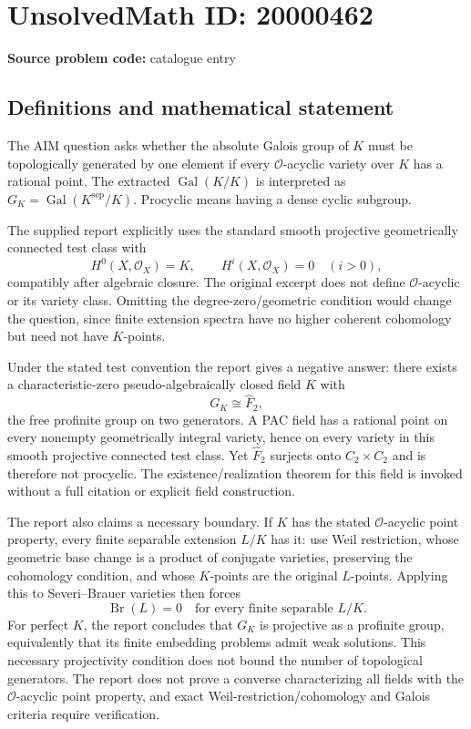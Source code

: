\documentclass[11pt]{article}
\begin{document}
\section*{UnsolvedMath ID: 20000462}
\textbf{Source problem code:} catalogue entry
\subsection{Definitions and mathematical statement}
The AIM question asks whether the absolute Galois group of $K$ must be topologically generated by one element if every $\mathcal O$-acyclic variety over $K$ has a rational point. The extracted $\operatorname{Gal}(K/K)$ is interpreted as $G_K=\operatorname{Gal}(K^{\mathrm{sep}}/K)$. Procyclic means having a dense cyclic subgroup.

The supplied report explicitly uses the standard smooth projective geometrically connected test class with
\[
 H^0(X,\mathcal O_X)=K,\qquad H^i(X,\mathcal O_X)=0\quad(i>0),
\]
compatibly after algebraic closure. The original excerpt does not define $\mathcal O$-acyclic or its variety class. Omitting the degree-zero/geometric condition would change the question, since finite extension spectra have no higher coherent cohomology but need not have $K$-points.

Under the stated test convention the report gives a negative answer: there exists a characteristic-zero pseudo-algebraically closed field $K$ with
\[
 G_K\cong\widehat F_2,
\]
the free profinite group on two generators. A PAC field has a rational point on every nonempty geometrically integral variety, hence on every variety in this smooth projective connected test class. Yet $\widehat F_2$ surjects onto $C_2\times C_2$ and is therefore not procyclic. The existence/realization theorem for this field is invoked without a full citation or explicit field construction.

The report also claims a necessary boundary. If $K$ has the stated $\mathcal O$-acyclic point property, every finite separable extension $L/K$ has it: use Weil restriction, whose geometric base change is a product of conjugate varieties, preserving the cohomology condition, and whose $K$-points are the original $L$-points. Applying this to Severi--Brauer varieties then forces
\[
 \operatorname{Br}(L)=0\quad\text{for every finite separable }L/K.
\]
For perfect $K$, the report concludes that $G_K$ is projective as a profinite group, equivalently that its finite embedding problems admit weak solutions. This necessary projectivity condition does not bound the number of topological generators. The report does not prove a converse characterizing all fields with the $\mathcal O$-acyclic point property, and exact Weil-restriction/cohomology and Galois criteria require verification.
\end{document}
